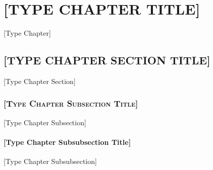 \chapter{\uppercase{[Type Chapter Title]}}
[Type Chapter]
\section{\uppercase{[Type Chapter Section Title]}}
[Type Chapter Section]
\subsection{\textsc{[Type Chapter Subsection Title]}}
[Type Chapter Subsection]
\subsubsection{[Type Chapter Subsubsection Title]}
[Type Chapter Subsubsection]